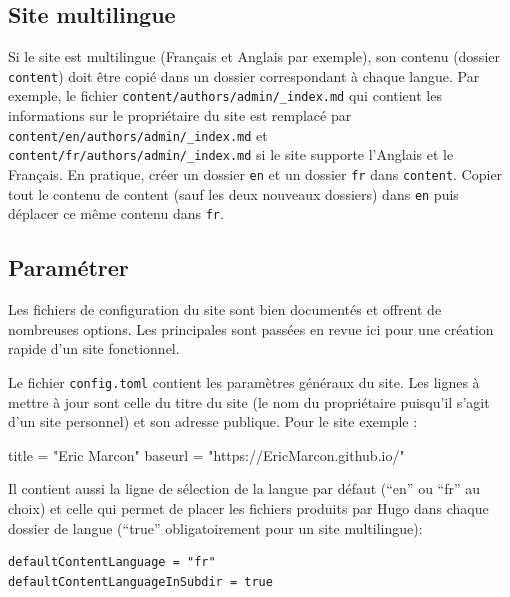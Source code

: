 \documentclass[
  12pt,
  french,
  a4paper,
  extrafontsizes,onecolumn,openright
  ]{memoir}
\newenvironment{Shaded}{\begin{snugshade}}{\end{snugshade}}
\newcommand{\NormalTok}[1]{#1}
\newcommand{\StringTok}[1]{\textcolor[rgb]{0.31,0.60,0.02}{#1}}
\begin{document}
\hypertarget{site-multilingue}{%
\subsection{Site multilingue}\label{site-multilingue}}

Si le site est multilingue (Français et Anglais par exemple), son contenu (dossier \texttt{content}) doit être copié dans un dossier correspondant à chaque langue.
Par exemple, le fichier \texttt{content/authors/admin/\_index.md} qui contient les informations sur le propriétaire du site est remplacé par \texttt{content/en/authors/admin/\_index.md} et \texttt{content/fr/authors/admin}\break\texttt{/\_index.md} si le site supporte l'Anglais et le Français.
En pratique, créer un dossier \texttt{en} et un dossier \texttt{fr} dans \texttt{content}.
Copier tout le contenu de content (sauf les deux nouveaux dossiers) dans \texttt{en} puis déplacer ce même contenu dans \texttt{fr}.

\hypertarget{paramuxe9trer}{%
\subsection{Paramétrer}\label{paramuxe9trer}}

Les fichiers de configuration du site sont bien documentés et offrent de nombreuses options.
Les principales sont passées en revue ici pour une création rapide d'un site fonctionnel.

Le fichier \texttt{config.toml} contient les paramètres généraux du site.
Les lignes à mettre à jour sont celle du titre du site (le nom du propriétaire puisqu'il s'agit d'un site personnel) et son adresse publique.
Pour le site exemple :

\scriptsize

\begin{Shaded}
\begin{Highlighting}[]
\NormalTok{title =}\StringTok{ "Eric Marcon"}
\NormalTok{baseurl =}\StringTok{ "https://EricMarcon.github.io/"}
\end{Highlighting}
\end{Shaded}

\normalsize

Il contient aussi la ligne de sélection de la langue par défaut (\enquote{en} ou \enquote{fr} au choix) et celle qui permet de placer les fichiers produits par Hugo dans chaque dossier de langue (\enquote{true} obligatoirement pour un site multilingue):

\begin{verbatim}
defaultContentLanguage = "fr"
defaultContentLanguageInSubdir = true
\end{verbatim}
\end{document}
